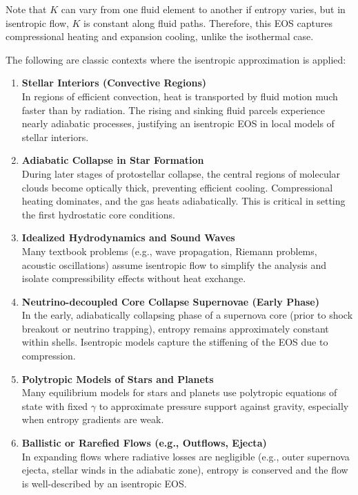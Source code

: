 Note that \( K \) can vary from one fluid element to another if entropy varies, but in isentropic flow, \( K \) is constant along fluid paths. Therefore, this EOS captures compressional heating and expansion cooling, unlike the isothermal case.

The following are classic contexts where the isentropic approximation is applied:

\begin{enumerate}
    \item \textbf{Stellar Interiors (Convective Regions)}\\
    In regions of efficient convection, heat is transported by fluid motion much faster than by radiation. The rising and sinking fluid parcels experience nearly adiabatic processes, justifying an isentropic EOS in local models of stellar interiors.

    \item \textbf{Adiabatic Collapse in Star Formation}\\
    During later stages of protostellar collapse, the central regions of molecular clouds become optically thick, preventing efficient cooling. Compressional heating dominates, and the gas heats adiabatically. This is critical in setting the first hydrostatic core conditions.

    \item \textbf{Idealized Hydrodynamics and Sound Waves}\\
    Many textbook problems (e.g., wave propagation, Riemann problems, acoustic oscillations) assume isentropic flow to simplify the analysis and isolate compressibility effects without heat exchange.

    \item \textbf{Neutrino-decoupled Core Collapse Supernovae (Early Phase)}\\
    In the early, adiabatically collapsing phase of a supernova core (prior to shock breakout or neutrino trapping), entropy remains approximately constant within shells. Isentropic models capture the stiffening of the EOS due to compression.

    \item \textbf{Polytropic Models of Stars and Planets}\\
    Many equilibrium models for stars and planets use polytropic equations of state with fixed \( \gamma \) to approximate pressure support against gravity, especially when entropy gradients are weak.

    \item \textbf{Ballistic or Rarefied Flows (e.g., Outflows, Ejecta)}\\
    In expanding flows where radiative losses are negligible (e.g., outer supernova ejecta, stellar winds in the adiabatic zone), entropy is conserved and the flow is well-described by an isentropic EOS.
\end{enumerate}

